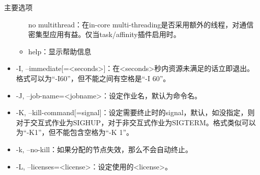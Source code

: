 \begin{frame}{主要选项}
\begin{itemize}
\begin{itemize}
    \item [no]multithread：在in-core multi-threading是否采用额外的线程，对通信密集型应用有益。仅当task/affinity插件启用时。
    \item help：显示帮助信息
\end{itemize}
    \item -I, --immediate[=<seconds>]：在<seconds>秒内资源未满足的话立即退出。格式可以为``-I60''，但不能之间有空格是``-I 60''。
    \item -J, --job-name=<jobname>：设定作业名，默认为命令名。
    \item -K, --kill-command[=signal]：设定需要终止时的signal，默认，如没指定，则对于交互式作业为SIGHUP，对于非交互式作业为SIGTERM。格式类似可以为``-K1''，但不能包含空格为``-K 1''。
    \item -k, --no-kill：如果分配的节点失效，那么不会自动终止。
    \item -L, --licenses=<license>：设定使用的<license>。
%
%
%

\end{itemize}
\end{frame}
